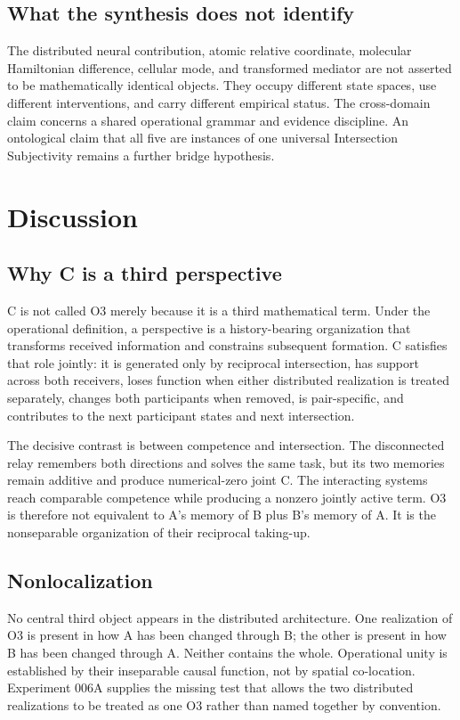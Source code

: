 \documentclass[11pt,a4paper]{article}
\begin{document}
\subsection{What the synthesis does not identify}

The distributed neural contribution, atomic relative coordinate, molecular Hamiltonian difference, cellular mode, and transformed mediator are not asserted to be mathematically identical objects. They occupy different state spaces, use different interventions, and carry different empirical status. The cross-domain claim concerns a shared operational grammar and evidence discipline. An ontological claim that all five are instances of one universal Intersection Subjectivity remains a further bridge hypothesis.

\section{Discussion}

\subsection{Why C is a third perspective}

C is not called O3 merely because it is a third mathematical term. Under the operational definition, a perspective is a history-bearing organization that transforms received information and constrains subsequent formation. C satisfies that role jointly: it is generated only by reciprocal intersection, has support across both receivers, loses function when either distributed realization is treated separately, changes both participants when removed, is pair-specific, and contributes to the next participant states and next intersection.

The decisive contrast is between competence and intersection. The disconnected relay remembers both directions and solves the same task, but its two memories remain additive and produce numerical-zero joint C. The interacting systems reach comparable competence while producing a nonzero jointly active term. O3 is therefore not equivalent to A's memory of B plus B's memory of A. It is the nonseparable organization of their reciprocal taking-up.

\subsection{Nonlocalization}

No central third object appears in the distributed architecture. One realization of O3 is present in how A has been changed through B; the other is present in how B has been changed through A. Neither contains the whole. Operational unity is established by their inseparable causal function, not by spatial co-location. Experiment 006A supplies the missing test that allows the two distributed realizations to be treated as one O3 rather than named together by convention.
\end{document}
